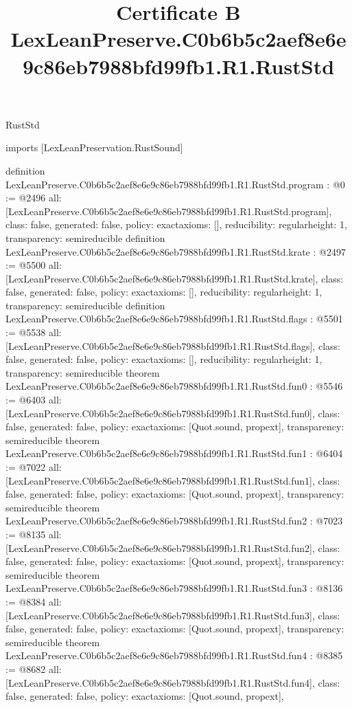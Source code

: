 \begin{lexlean}{RustStd}
\title{Certificate B LexLeanPreserve.C0b6b5c2aef8e6e9c86eb7988bfd99fb1.R1.RustStd}
\begin{coremodule}
imports [LexLeanPreservation.RustSound]

definition LexLeanPreserve.C0b6b5c2aef8e6e9c86eb7988bfd99fb1.R1.RustStd.program : @0 := @2496 {
  all: [LexLeanPreserve.C0b6b5c2aef8e6e9c86eb7988bfd99fb1.R1.RustStd.program],
  class: false,
  generated: false,
  policy: exact{axioms: []},
  reducibility: regular{height: 1},
  transparency: semireducible
}
definition LexLeanPreserve.C0b6b5c2aef8e6e9c86eb7988bfd99fb1.R1.RustStd.krate : @2497 := @5500 {
  all: [LexLeanPreserve.C0b6b5c2aef8e6e9c86eb7988bfd99fb1.R1.RustStd.krate],
  class: false,
  generated: false,
  policy: exact{axioms: []},
  reducibility: regular{height: 1},
  transparency: semireducible
}
definition LexLeanPreserve.C0b6b5c2aef8e6e9c86eb7988bfd99fb1.R1.RustStd.flags : @5501 := @5538 {
  all: [LexLeanPreserve.C0b6b5c2aef8e6e9c86eb7988bfd99fb1.R1.RustStd.flags],
  class: false,
  generated: false,
  policy: exact{axioms: []},
  reducibility: regular{height: 1},
  transparency: semireducible
}
theorem LexLeanPreserve.C0b6b5c2aef8e6e9c86eb7988bfd99fb1.R1.RustStd.fun0 : @5546 := @6403 {
  all: [LexLeanPreserve.C0b6b5c2aef8e6e9c86eb7988bfd99fb1.R1.RustStd.fun0],
  class: false,
  generated: false,
  policy: exact{axioms: [Quot.sound, propext]},
  transparency: semireducible
}
theorem LexLeanPreserve.C0b6b5c2aef8e6e9c86eb7988bfd99fb1.R1.RustStd.fun1 : @6404 := @7022 {
  all: [LexLeanPreserve.C0b6b5c2aef8e6e9c86eb7988bfd99fb1.R1.RustStd.fun1],
  class: false,
  generated: false,
  policy: exact{axioms: [Quot.sound, propext]},
  transparency: semireducible
}
theorem LexLeanPreserve.C0b6b5c2aef8e6e9c86eb7988bfd99fb1.R1.RustStd.fun2 : @7023 := @8135 {
  all: [LexLeanPreserve.C0b6b5c2aef8e6e9c86eb7988bfd99fb1.R1.RustStd.fun2],
  class: false,
  generated: false,
  policy: exact{axioms: [Quot.sound, propext]},
  transparency: semireducible
}
theorem LexLeanPreserve.C0b6b5c2aef8e6e9c86eb7988bfd99fb1.R1.RustStd.fun3 : @8136 := @8384 {
  all: [LexLeanPreserve.C0b6b5c2aef8e6e9c86eb7988bfd99fb1.R1.RustStd.fun3],
  class: false,
  generated: false,
  policy: exact{axioms: [Quot.sound, propext]},
  transparency: semireducible
}
theorem LexLeanPreserve.C0b6b5c2aef8e6e9c86eb7988bfd99fb1.R1.RustStd.fun4 : @8385 := @8682 {
  all: [LexLeanPreserve.C0b6b5c2aef8e6e9c86eb7988bfd99fb1.R1.RustStd.fun4],
  class: false,
  generated: false,
  policy: exact{axioms: [Quot.sound, propext]},
}
\end{coremodule}
\end{lexlean}
